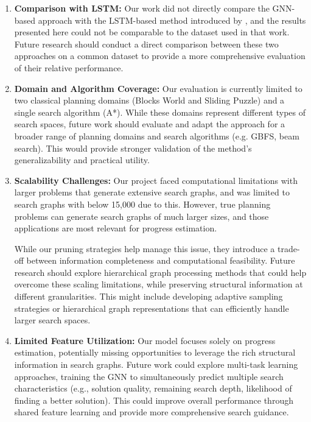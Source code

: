 \documentclass[letterpaper]{article}
\newcommand{\naomi}[1]{{\color{magenta}{Naomi: #1}}}
\begin{document}
\begin{enumerate}
    \item \textbf{Comparison with LSTM:} Our work did not directly compare the GNN-based approach with the LSTM-based method introduced by \citet{sudry2022learning}, and the results presented here could not be comparable to the dataset used in that work. Future research should conduct a direct comparison between these two approaches on a common dataset to provide a more comprehensive evaluation of their relative performance. \naomi{revise this}
    
    \item \textbf{Domain and Algorithm Coverage:} Our evaluation is currently limited to two classical planning domains (Blocks World and Sliding Puzzle) and a single search algorithm (A*). While these domains represent different types of search spaces, future work should evaluate and adapt the approach for a broader range of planning domains and search algorithms (e.g. GBFS, beam search). This would provide stronger validation of the method's generalizability and practical utility.
    
    \item \textbf{Scalability Challenges:} Our project faced computational limitations with larger problems that generate extensive search graphs, and was limited to search graphs with below 15,000 due to this. However, true planning problems can generate search graphs of much larger sizes, and those applications are most relevant for progress estimation.
    
    While our pruning strategies help manage this issue, they introduce a trade-off between information completeness and computational feasibility. Future research should explore hierarchical graph processing methods that could help overcome these scaling limitations, while preserving structural information at different granularities. This might include developing adaptive sampling strategies or hierarchical graph representations that can efficiently handle larger search spaces.
    
    \item \textbf{Limited Feature Utilization:} Our model focuses solely on progress estimation, potentially missing opportunities to leverage the rich structural information in search graphs. Future work could explore multi-task learning approaches, training the GNN to simultaneously predict multiple search characteristics (e.g., solution quality, remaining search depth, likelihood of finding a better solution). This could improve overall performance through shared feature learning and provide more comprehensive search guidance.
\end{enumerate}
\end{document}

